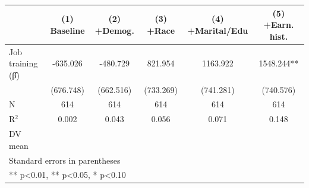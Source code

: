 \begin{table}[htbp]
\centering
\begin{tabular}{lccccc}
\hline\hline
 & (1) Baseline & (2) +Demog. & (3) +Race & (4) +Marital/Edu & (5) +Earn. hist. \\
\hline
Job training (β̂) & -635.026 & -480.729 & 821.954 & 1163.922 & 1548.244** \\
 & (676.748) & (662.516) & (733.269) & (741.281) & (740.576) \\
\hline
N & 614 & 614 & 614 & 614 & 614 \\
R$^2$ & 0.002 & 0.043 & 0.056 & 0.071 & 0.148 \\
DV mean &  &  &  &  &  \\
\hline\hline
\multicolumn{6}{l}{\footnotesize Standard errors in parentheses} \\
\multicolumn{6}{l}{\footnotesize *** p<0.01, ** p<0.05, * p<0.10} \\
\end{tabular}
\end{table}